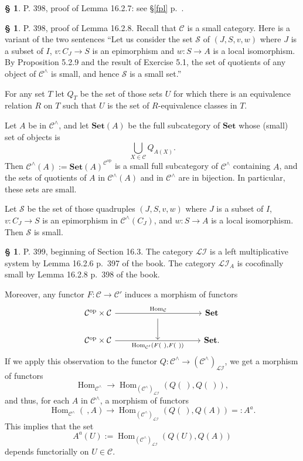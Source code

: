 \documentclass[12pt]{article}%
\theoremstyle{remark}
\theoremstyle{definition}
\newtheorem{s}[thm]{\S}%
\newcommand{\cc}{\mathcal}
\newcommand{\C}{\mathcal C}
\newcommand{\Set}{\mathbf{Set}}
\DeclareMathOperator{\Hom}{Hom}%
\DeclareMathOperator{\op}{op}
\begin{document}
%

\begin{s} 
P. 398, proof of Lemma 16.2.7: see \S\ref{fpl} p.~\pageref{fpl}.
\end{s}


%

\begin{s} 
P. 398, proof of Lemma 16.2.8. Recall that $\C$ is a small category. Here is a variant of the two sentences ``Let us consider the set $\cc S$ of $(J,S,v,w)$ where $J$ is a subset of $I$, $v:C_J\to S$ is an epimorphism and $w:S\to A$ is a local isomorphism. By Proposition 5.2.9 and the result of Exercise 5.1, the set of quotients of any object of $\C^\wedge$ is small, and hence $\cc S$ is a small set.'' 

For any set $T$ let $Q_T$ be the set of those sets $U$ for which there is an equivalence relation $R$ on $T$ such that $U$ is the set of $R$-equivalence classes in $T$. 

Let $A$ be in $\C^\wedge$, and let $\Set(A)$ be the full subcategory of $\Set$ whose (small) set of objects is 
$$
\bigcup_{X\in\C}Q_{A(X)}.
$$ 
Then $\C^\wedge(A):=\Set(A)^{\C^{\op}}$ is a small full subcategory of $\C^\wedge$ containing $A$, and the sets of quotients of $A$ in $\C^\wedge(A)$ and in $\C^\wedge$ are in bijection. In particular, these sets are small. 

Let $\cc S$ be the set of those quadruples $(J,S,v,w)$ where $J$ is a subset of $I$, $v:C_J\to S$ is an epimorphism in $\C^\wedge(C_J)$, and $w:S\to A$ is a local isomorphism. Then $\cc S$ is small.
\end{s}

%

\begin{s}%
P. 399, beginning of Section 16.3. The category $\cc{LI}$ is a left multiplicative system by Lemma 16.2.6 p.~397 of the book. The category $\cc{LI}_A$ is cocofinally small by Lemma 16.2.8 p.~398 of the book. 

Moreover, any functor $F:\C\to\C'$ induces a morphism of functors 
$$
\begin{tikzcd}
%
\C^{\op}\times\C\ar{rrrr}{\Hom_\C}&&\ar{d}&&\Set\\ 
\C^{\op}\times\C\ar{rrrr}[swap]{\Hom_{\C'}(F(\ ),F(\ ))}&&{}&&\Set.
%
\end{tikzcd}
$$
If we apply this observation to the functor $Q:\C^\wedge\to(\C^\wedge)_{\cc{LI}}$, we get a morphism of functors 
$$
\Hom_{\C^\wedge}\to\Hom_{(\C^\wedge)_{\cc{LI}}}(Q(\ ),Q(\ )),
$$ 
and thus, for each $A$ in $\C^\wedge$, a morphism of functors 
$$
\Hom_{\C^\wedge}(\ ,A)\to\Hom_{(\C^\wedge)_{\cc{LI}}}(Q(\ ),Q(A))=:A^a.
$$ 
This implies that the set 
$$
A^a(U):=\Hom_{(\C^\wedge)_{\cc{LI}}}(Q(U),Q(A))
$$ 
depends functorially on $U\in\C$.
\end{s}
\end{document}
